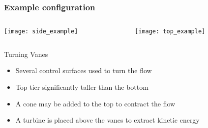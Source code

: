 \documentclass[mathserif]{beamer}
\begin{document}
%
%
%
\begin{frame}
\frametitle{Example configuration}

\begin{columns}[]
  \begin{column}{0.5\linewidth}

   \begin{center}
    \texttt{[image: side\_example]}
   \end{center}


  \end{column}
  \begin{column}{0.5\linewidth}

   \begin{center}
    \texttt{[image: top\_example]}
   \end{center}

  \end{column}
\end{columns}

   \begin{block}{Turning Vanes}
    \begin{itemize}
     \item Several control surfaces used to turn the flow
     \item Top tier significantly taller than the bottom
     \item A cone may be added to the top to contract the flow
     \item A turbine is placed above the vanes to extract kinetic energy
    \end{itemize}
   \end{block}
   
\end{frame}
\end{document}
